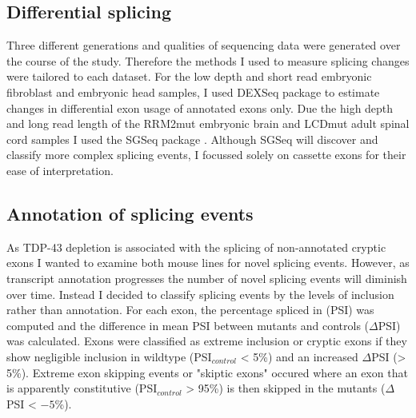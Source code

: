 \subsection{Differential splicing}
Three different generations and qualities of sequencing data were generated over the course of the study.  Therefore the methods I  used  to  measure  splicing  changes  were  tailored to each dataset. 
For the low depth and short read embryonic fibroblast and  embryonic head samples, I used DEXSeq package \citep{Anders2012} to estimate changes in differential exon usage of annotated exons only.
Due the high depth and long read length of the RRM2mut embryonic brain and LCDmut adult spinal cord samples I used the SGSeq package \citep{Goldstein2016}.
Although SGSeq will discover and classify more complex splicing events, I focussed solely on cassette exons for their ease of interpretation.

\subsection{Annotation of splicing events}

As TDP-43 depletion is associated with the splicing of non-annotated cryptic exons \citep{Ling2015} I wanted to examine both mouse lines for novel splicing events.
However, as transcript annotation progresses the number of novel splicing events will diminish over time. 
Instead  I decided to classify splicing events by the levels of inclusion rather than annotation. 
For each exon, the percentage spliced in (PSI) was computed and the difference in mean PSI between mutants and controls ($\Delta$PSI) was calculated.
Exons were classified as extreme inclusion or cryptic exons if they show negligible inclusion in wildtype (PSI$_{control}$ < 5\%) and an increased $\Delta$PSI (> 5\%).
Extreme exon skipping events or "skiptic exons" occured where an exon that is apparently constitutive (PSI$_{control}$ > 95\%) is then skipped in the mutants ($\Delta$PSI < $-5$\%).

